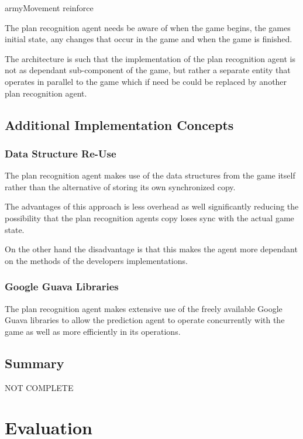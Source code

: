 \documentclass[parskip]{cs4rep}
\begin{document}
armyMovement
reinforce

The plan recognition agent needs be aware of when the game begins, the games initial state, any changes that occur in the game and when the game is finished.

The architecture is such that the implementation of the plan recognition agent is not as dependant sub-component of the game, but rather a separate entity that operates in parallel to the game which if need be could be replaced by another plan recognition agent.

\section{Additional Implementation Concepts}

\subsection{Data Structure Re-Use}

The plan recognition agent makes use of the data structures from the game itself rather than the alternative of storing its own synchronized copy.

The advantages of this approach is less overhead as well significantly reducing the possibility that the plan recognition agents copy loses sync with the actual game state. 

On the other hand the disadvantage is that this makes the agent more dependant on the methods of the developers implementations.

\subsection{Google Guava Libraries}

The plan recognition agent makes extensive use of the freely available Google Guava libraries to allow the prediction agent to operate concurrently with the game as well as more efficiently in its operations.

\section{Summary}

NOT COMPLETE

\chapter{Evaluation} 
\end{document}
